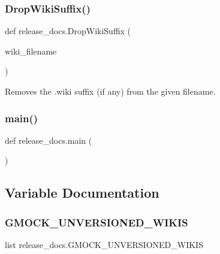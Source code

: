 \subsubsection{\texorpdfstring{Drop\+Wiki\+Suffix()}{DropWikiSuffix()}}
{\footnotesize\ttfamily def release\+\_\+docs.\+Drop\+Wiki\+Suffix (\begin{DoxyParamCaption}\item[{}]{wiki\+\_\+filename }\end{DoxyParamCaption})}

\begin{DoxyVerb}Removes the .wiki suffix (if any) from the given filename.\end{DoxyVerb}
 \mbox{\label{namespacerelease__docs_ac4eb92814ebe701e3936d1bfdd2ecf73}} 
\subsubsection{\texorpdfstring{main()}{main()}}
{\footnotesize\ttfamily def release\+\_\+docs.\+main (\begin{DoxyParamCaption}{ }\end{DoxyParamCaption})}



\subsection{Variable Documentation}
\mbox{\label{namespacerelease__docs_a675f92ba4643a6aef7773a6178e49b29}} 
\subsubsection{\texorpdfstring{G\+M\+O\+C\+K\+\_\+\+U\+N\+V\+E\+R\+S\+I\+O\+N\+E\+D\+\_\+\+W\+I\+K\+IS}{GMOCK\_UNVERSIONED\_WIKIS}}
{\footnotesize\ttfamily list release\+\_\+docs.\+G\+M\+O\+C\+K\+\_\+\+U\+N\+V\+E\+R\+S\+I\+O\+N\+E\+D\+\_\+\+W\+I\+K\+IS}

